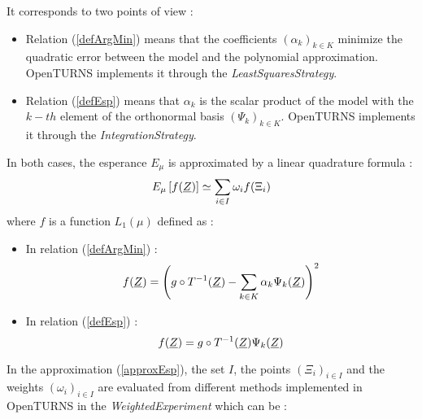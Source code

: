It corresponds to two points of view :
\begin{itemize}
\item Relation (\ref{defArgMin})  means that the coefficients $(\alpha_k)_{k \in K}$ minimize the quadratic error between  the model and the polynomial approximation. OpenTURNS implements it through the \emph{LeastSquaresStrategy}.
\item  Relation (\ref{defEsp}) means that  $\alpha_k$ is the scalar product of the model  with the $k-th$ element of the orthonormal basis $(\Psi_k)_{k \in K}$. OpenTURNS implements it through the \emph{IntegrationStrategy}.
\end{itemize}

In both cases, the esperance $ E_{\mu}$ is approximated by a linear quadrature formula :
\begin{equation}\label{approxEsp}
  E_{\mu} \left[ f({\underline{Z}}) \right] \simeq \sum_{i \in I} \omega_i f(\Xi_i)
\end{equation}
where $f$ is a function $L_1(\mu)$ defined as :
\begin{itemize}
\item In relation (\ref{defArgMin}) :
  \begin{equation}\label{fArgMin}
    f({\underline{Z}}) = \left( g \circ T^{-1}({\underline{Z}}) -  \sum_{k \in K} \alpha_k \Psi_k ({\underline{Z}})\right)^2
  \end{equation}
\item In relation (\ref{defEsp}) :
  \begin{equation}\label{fEsp}
    f({\underline{Z}}) = g \circ T^{-1}({\underline{Z}}) \Psi_k ({\underline{Z}})
  \end{equation}
\end{itemize}
In the approximation (\ref{approxEsp}), the set $I$, the points $(\Xi_i)_{i \in I}$ and the weights $(\omega_i)_{i \in I}$ are evaluated from different methods implemented in OpenTURNS in the \emph{WeightedExperiment} which can be :

